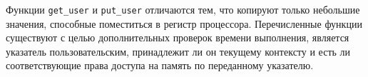 Функции \texttt{get\_user} и \texttt{put\_user} отличаются тем, что копируют
только небольшие значения, способные поместиться в регистр процессора.
Перечисленные функции существуют с целью дополнительных проверок времени
выполнения, является указатель пользовательским, принадлежит ли он текущему
контексту и есть ли соответствующие права доступа на память по переданному
указателю.
